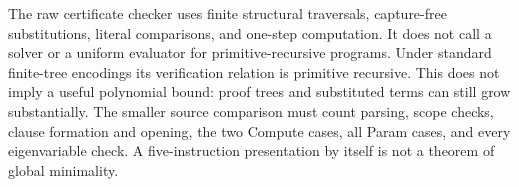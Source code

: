 The raw certificate checker uses finite structural traversals,
capture-free substitutions, literal comparisons, and one-step computation.
It does not call a solver or a uniform evaluator for primitive-recursive
programs.  Under standard finite-tree encodings its verification relation
is primitive recursive.  This does not imply a useful polynomial bound:
proof trees and substituted terms can still grow substantially.
The smaller source comparison must count parsing, scope checks, clause
formation and opening, the two Compute cases, all Param cases, and every
eigenvariable check.  A five-instruction presentation by itself is not
a theorem of global minimality.

